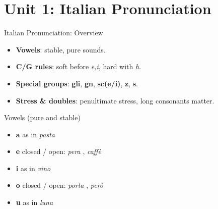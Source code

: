 \section{Unit 1: Italian Pronunciation}

\blueheader
\begin{frame}{Italian Pronunciation: Overview}
\begin{itemize}
  \item \textbf{Vowels}: stable, pure sounds.
  \item \textbf{C/G rules}: soft before \textit{e,i}, hard with \textit{h}.
  \item \textbf{Special groups}: \textbf{gli}, \textbf{gn}, \textbf{sc(e/i)}, \textbf{z}, \textbf{s}.
  \item \textbf{Stress \& doubles}: penultimate stress, long consonants matter.
\end{itemize}

\medskip
{}
\end{frame}

\redheader
\begin{frame}{Vowels (pure and stable)}
\begin{itemize}
  \item \textbf{a} \textipa{[a]} as in \textit{pasta} \textipa{["pasta]}
  \item \textbf{e} \textipa{[e]} closed / \textipa{[E]} open: \textit{pera} \textipa{["pe:ra]}, \textit{caff\`e} \textipa{[kaf"E]}
  \item \textbf{i} \textipa{[i]} as in \textit{vino} \textipa{["vino]}
  \item \textbf{o} \textipa{[o]} closed / \textipa{[O]} open: \textit{porta} \textipa{["pOrta]}, \textit{per\`o} \textipa{[pe"RO]}
  \item \textbf{u} \textipa{[u]} as in \textit{luna} \textipa{["luna]}
\end{itemize}

\medskip
{}
\end{frame}

